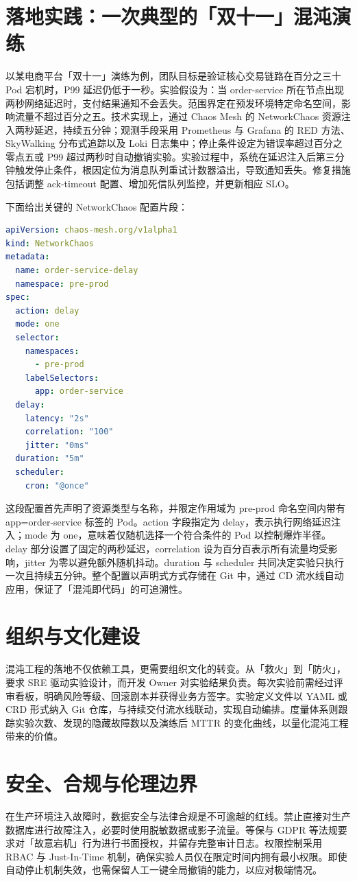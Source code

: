 \chapter{落地实践：一次典型的「双十一」混沌演练}
以某电商平台「双十一」演练为例，团队目标是验证核心交易链路在百分之三十 Pod 宕机时，P99 延迟仍低于一秒。实验假设为：当 order-service 所在节点出现两秒网络延迟时，支付结果通知不会丢失。范围界定在预发环境特定命名空间，影响流量不超过百分之五。技术实现上，通过 Chaos Mesh 的 NetworkChaos 资源注入两秒延迟，持续五分钟；观测手段采用 Prometheus 与 Grafana 的 RED 方法、SkyWalking 分布式追踪以及 Loki 日志集中；停止条件设定为错误率超过百分之零点五或 P99 超过两秒时自动撤销实验。实验过程中，系统在延迟注入后第三分钟触发停止条件，根因定位为消息队列重试计数器溢出，导致通知丢失。修复措施包括调整 ack-timeout 配置、增加死信队列监控，并更新相应 SLO。\par
下面给出关键的 NetworkChaos 配置片段：\par
\begin{lstlisting}[language=yaml]
apiVersion: chaos-mesh.org/v1alpha1
kind: NetworkChaos
metadata:
  name: order-service-delay
  namespace: pre-prod
spec:
  action: delay
  mode: one
  selector:
    namespaces:
      - pre-prod
    labelSelectors:
      app: order-service
  delay:
    latency: "2s"
    correlation: "100"
    jitter: "0ms"
  duration: "5m"
  scheduler:
    cron: "@once"
\end{lstlisting}
这段配置首先声明了资源类型与名称，并限定作用域为 pre-prod 命名空间内带有 app=order-service 标签的 Pod。action 字段指定为 delay，表示执行网络延迟注入；mode 为 one，意味着仅随机选择一个符合条件的 Pod 以控制爆炸半径。delay 部分设置了固定的两秒延迟，correlation 设为百分百表示所有流量均受影响，jitter 为零以避免额外随机抖动。duration 与 scheduler 共同决定实验只执行一次且持续五分钟。整个配置以声明式方式存储在 Git 中，通过 CD 流水线自动应用，保证了「混沌即代码」的可追溯性。\par
\chapter{组织与文化建设}
混沌工程的落地不仅依赖工具，更需要组织文化的转变。从「救火」到「防火」，要求 SRE 驱动实验设计，而开发 Owner 对实验结果负责。每次实验前需经过评审看板，明确风险等级、回滚剧本并获得业务方签字。实验定义文件以 YAML 或 CRD 形式纳入 Git 仓库，与持续交付流水线联动，实现自动编排。度量体系则跟踪实验次数、发现的隐藏故障数以及演练后 MTTR 的变化曲线，以量化混沌工程带来的价值。\par
\chapter{安全、合规与伦理边界}
在生产环境注入故障时，数据安全与法律合规是不可逾越的红线。禁止直接对生产数据库进行故障注入，必要时使用脱敏数据或影子流量。等保与 GDPR 等法规要求对「故意宕机」行为进行书面授权，并留存完整审计日志。权限控制采用 RBAC 与 Just-In-Time 机制，确保实验人员仅在限定时间内拥有最小权限。即使自动停止机制失效，也需保留人工一键全局撤销的能力，以应对极端情况。\par
